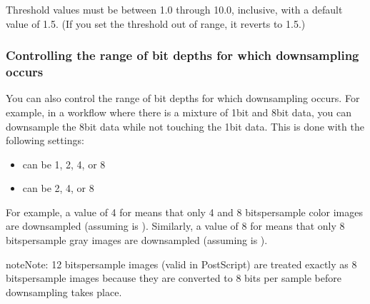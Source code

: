 \documentclass[letterpaper,12pt,english,openany,oneside]{sphinxmanual}
\begin{document}
\begin{sphinxVerbatim}[commandchars=\\\{\}]
         
\end{sphinxVerbatim}

Threshold values must be between 1.0 through 10.0, inclusive, with a default value of 1.5. (If you set the threshold out of range, it reverts to 1.5.)




\subsubsection{Controlling the range of bit depths for which downsampling occurs}
\label{\detokenize{PDF_Create_UsingSettings:controlling-the-range-of-bit-depths-for-which-downsampling-occurs}}
You can also control the range of bit depths for which downsampling occurs. For example, in a workflow where there is a mixture of 1\sphinxhyphen{}bit and 8\sphinxhyphen{}bit data, you can downsample the 8\sphinxhyphen{}bit data while not touching the 1\sphinxhyphen{}bit data. This is done with the following settings:
\begin{itemize}
\item {} 
 can be 1, 2, 4, or 8

\item {} 
 can be 2, 4, or 8

\end{itemize}

For example, a value of 4 for  means that only 4\sphinxhyphen{} and 8 bits\sphinxhyphen{}per\sphinxhyphen{}sample color images are downsampled (assuming  is  ). Similarly, a value of 8 for  means that only 8 bits\sphinxhyphen{}per\sphinxhyphen{}sample gray images are downsampled (assuming  is  ).

\begin{sphinxadmonition}{note}{Note:}
12 bits\sphinxhyphen{}per\sphinxhyphen{}sample images (valid in PostScript) are treated exactly as 8 bits\sphinxhyphen{}per\sphinxhyphen{}sample images because they are converted to 8 bits per sample before downsampling takes place.
\end{sphinxadmonition}
\end{document}
